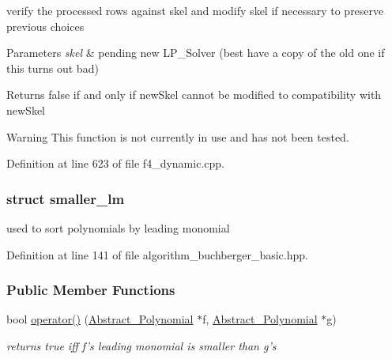 verify the processed rows against {\ttfamily skel} and modify {\ttfamily skel} if necessary to preserve previous choices 


\begin{DoxyParams}{Parameters}
{\em skel} & pending new {\ttfamily L\+P\+\_\+\+Solver} (best have a copy of the old one if this turns out bad) \\
\hline
\end{DoxyParams}
\begin{DoxyReturn}{Returns}
{\ttfamily false} if and only if {\ttfamily new\+Skel} cannot be modified to compatibility with {\ttfamily new\+Skel} 
\end{DoxyReturn}
\begin{DoxyWarning}{Warning}
This function is not currently in use and has not been tested. 
\end{DoxyWarning}


Definition at line 623 of file f4\+\_\+dynamic.\+cpp.

\label{structsmaller__lm}
\subsubsection{struct smaller\+\_\+lm}
used to sort polynomials by leading monomial 

Definition at line 141 of file algorithm\+\_\+buchberger\+\_\+basic.\+hpp.

\subsubsection*{Public Member Functions}
\begin{DoxyCompactItemize}
\item 
bool \hyperlink{group___g_b_computation_a683ffd0302d029cd21c5bafdf4335785}{operator()} (\hyperlink{group__polygroup_class_abstract___polynomial}{Abstract\+\_\+\+Polynomial} $\ast$f, \hyperlink{group__polygroup_class_abstract___polynomial}{Abstract\+\_\+\+Polynomial} $\ast$g)
\begin{DoxyCompactList}\small\item\em returns {\ttfamily true} iff {\ttfamily f's} leading monomial is smaller than {\ttfamily g's} \end{DoxyCompactList}\end{DoxyCompactItemize}


